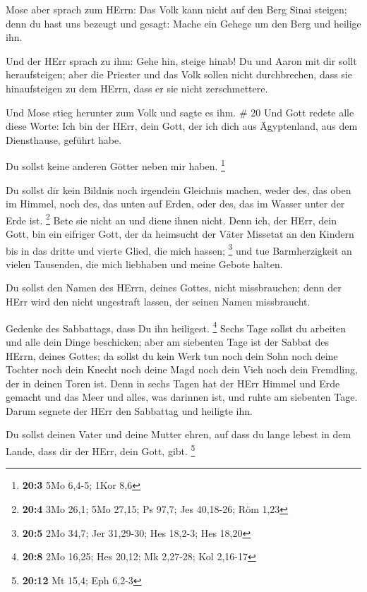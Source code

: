  Mose aber sprach zum HErrn: Das Volk kann nicht auf den
Berg Sinai steigen; denn du hast uns bezeugt und gesagt: Mache ein
Gehege um den Berg und heilige ihn.

 Und der HErr sprach zu ihm: Gehe hin, steige hinab! Du und
Aaron mit dir sollt heraufsteigen; aber die Priester und das Volk sollen
nicht durchbrechen, dass sie hinaufsteigen zu dem HErrn, dass er sie
nicht zerschmettere.

 Und Mose stieg herunter zum Volk und sagte es ihm. \# 20
 Und Gott redete alle diese Worte:  Ich bin der
HErr, dein Gott, der ich dich aus Ägyptenland, aus dem Diensthause,
geführt habe.

 Du sollst keine anderen Götter neben mir haben. \footnote{\textbf{20:3}
  5Mo 6,4-5; 1Kor 8,6}

 Du sollst dir kein Bildnis noch irgendein Gleichnis machen,
weder des, das oben im Himmel, noch des, das unten auf Erden, oder des,
das im Wasser unter der Erde ist. \footnote{\textbf{20:4} 3Mo 26,1; 5Mo
  27,15; Ps 97,7; Jes 40,18-26; Röm 1,23}  Bete sie nicht an
und diene ihnen nicht. Denn ich, der HErr, dein Gott, bin ein eifriger
Gott, der da heimsucht der Väter Missetat an den Kindern bis in das
dritte und vierte Glied, die mich hassen; \footnote{\textbf{20:5} 2Mo
  34,7; Jer 31,29-30; Hes 18,2-3; Hes 18,20}  und tue
Barmherzigkeit an vielen Tausenden, die mich liebhaben und meine Gebote
halten.

 Du sollst den Namen des HErrn, deines Gottes, nicht
missbrauchen; denn der HErr wird den nicht ungestraft lassen, der seinen
Namen missbraucht.

 Gedenke des Sabbattags, dass Du ihn heiligest. \footnote{\textbf{20:8}
  2Mo 16,25; Hes 20,12; Mk 2,27-28; Kol 2,16-17}  Sechs Tage
sollst du arbeiten und alle dein Dinge beschicken;  aber am
siebenten Tage ist der Sabbat des HErrn, deines Gottes; da sollst du
kein Werk tun noch dein Sohn noch deine Tochter noch dein Knecht noch
deine Magd noch dein Vieh noch dein Fremdling, der in deinen Toren ist.
 Denn in sechs Tagen hat der HErr Himmel und Erde gemacht
und das Meer und alles, was darinnen ist, und ruhte am siebenten Tage.
Darum segnete der HErr den Sabbattag und heiligte ihn.

 Du sollst deinen Vater und deine Mutter ehren, auf dass du
lange lebest in dem Lande, dass dir der HErr, dein Gott, gibt.
\footnote{\textbf{20:12} Mt 15,4; Eph 6,2-3}

